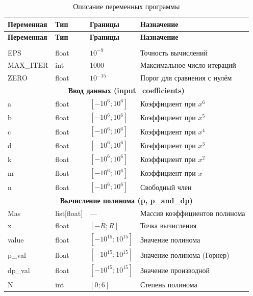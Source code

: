 \documentclass[a4paper,14pt]{extarticle}
\begin{document}
\begin{longtable}{|p{3cm}|p{2.5cm}|p{3cm}|p{5cm}|}
\caption{Описание переменных программы}\label{tab:vars}\\
\hline
\textbf{Переменная} & \textbf{Тип} & \textbf{Границы} & \textbf{Назначение} \\
\hline
\endfirsthead
\hline
\textbf{Переменная} & \textbf{Тип} & \textbf{Границы} & \textbf{Назначение} \\
\hline
\endhead
\hline
\endfoot

\multicolumn{4}{|c|}{\textbf{Глобальные константы}} \\
\hline
EPS & float & $10^{-9}$ & Точность вычислений \\
\hline
MAX\_ITER & int & 1000 & Максимальное число итераций \\
\hline
ZERO & float & $10^{-15}$ & Порог для сравнения с нулём \\
\hline

\multicolumn{4}{|c|}{\textbf{Ввод данных (input\_coefficients)}} \\
\hline
a & float & $[-10^6; 10^6]$ & Коэффициент при $x^6$ \\
\hline
b & float & $[-10^6; 10^6]$ & Коэффициент при $x^5$ \\
\hline
c & float & $[-10^6; 10^6]$ & Коэффициент при $x^4$ \\
\hline
d & float & $[-10^6; 10^6]$ & Коэффициент при $x^3$ \\
\hline
k & float & $[-10^6; 10^6]$ & Коэффициент при $x^2$ \\
\hline
m & float & $[-10^6; 10^6]$ & Коэффициент при $x$ \\
\hline
n & float & $[-10^6; 10^6]$ & Свободный член \\
\hline

\multicolumn{4}{|c|}{\textbf{Вычисление полинома (p, p\_and\_dp)}} \\
\hline
Mas & list[float] & --- & Массив коэффициентов полинома \\
\hline
x & float & $[-R; R]$ & Точка вычисления \\
\hline
value & float & $[-10^{15}; 10^{15}]$ & Значение полинома \\
\hline
p\_val & float & $[-10^{15}; 10^{15}]$ & Значение полинома (Горнер) \\
\hline
dp\_val & float & $[-10^{15}; 10^{15}]$ & Значение производной \\
\hline
N & int & $[0;6]$ & Степень полинома \\
\hline


\end{longtable}
\end{document}
